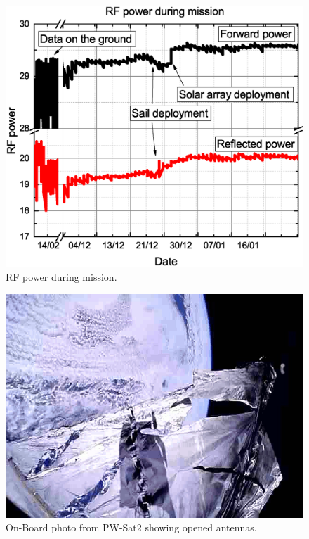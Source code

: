 \begin{figure}[H]
    \centering
    \includegraphics[width=0.6\paperwidth]{img/4/rf_power_comm.eps}
    \caption{RF power during mission.}
    \label{4_rf_power_comm}
\end{figure}

\begin{figure}[H]
    \centering
    \includegraphics[width=0.7\paperwidth]{img/4/antennas_deployed_orbit.jpg}
    \caption{On-Board photo from PW-Sat2 showing opened antennas.}
    \label{antennas_deployed_orbit}
\end{figure}


